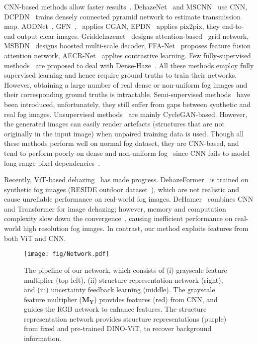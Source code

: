 \documentclass[runningheads]{llncs}
\begin{document}
CNN-based methods allow faster results~\cite{li2017haze,ye2021perceiving,lin2020gait,lin2021gait}.
DehazeNet~\cite{cai2016dehazenet} and MSCNN~\cite{ren2016single} use CNN, DCPDN~\cite{zhang2018densely} trains densely connected pyramid network to estimate transmission map.
AODNet~\cite{li2017aod}, GFN~\cite{ren2018gated},~\cite{li2018single} applies CGAN, EPDN~\cite{qu2019enhanced} applies pix2pix, they end-to-end output clear images.
Griddehazenet~\cite{liu2019griddehazenet} designs attention-based~\cite{jin2021dc} grid network, MSBDN~\cite{dong2020multi} designs boosted multi-scale decoder, FFA-Net~\cite{qin2020ffa} proposes feature fusion attention network, AECR-Net~\cite{wu2021contrastive} applies contrastive learning. 
Few fully-supervised methods~\cite{dudhane2019ri,bianco2019high,morales2019feature} are proposed to deal with Dense-Haze~\cite{ancuti2019dense}.
All these methods employ fully supervised learning and hence require ground truths to train their networks. 
However, obtaining a large number of real dense or non-uniform fog images and their corresponding ground truths is intractable. 
Semi-supervised methods~\cite{li2019semi,shao2020domain,chen2021psd,li2022physically} have been introduced, 
unfortunately, they still suffer from gaps between synthetic and real fog images.
Unsupervised methods~\cite{huang2019towards,golts2019unsupervised,li2021you,zhao2021refinednet,yang2022self} are mainly CycleGAN-based.
However, the generated images can easily render artefacts (structures that are not originally in the input image) when unpaired training data is used.
Though all these methods perform well on normal fog dataset, they are CNN-based, and tend to perform poorly on dense and non-uniform fog~\cite{guo2022image} since CNN fails to model long-range pixel dependencies~\cite{dosovitskiy2020image}.
 
Recently, ViT-based dehazing~\cite{guo2022image,song2022vision} has made progress.
DehazeFormer~\cite{song2022vision} is trained on synthetic fog images (RESIDE outdoor dataset~\cite{li2018benchmarking}), which are not realistic and cause unreliable performance on real-world fog images.
DeHamer~\cite{guo2022image} combines CNN and Transformer for image dehazing; however, memory and computation complexity slow down the convergence~\cite{zhu2020deformable}, causing inefficient performance on real-world high resolution fog images.
In contrast, our method exploits features from both ViT and CNN.

\begin{figure*}[t!]
	\centering
	{\texttt{[image: fig/Network.pdf]}}\hfill
	\caption{The pipeline of our network, which consists of (i) grayscale feature multiplier (top left), (ii) structure representation network (right), and (iii) uncertainty feedback learning (middle).
	The grayscale feature multiplier ($\mathbf{M_Y}$) provides features (red) from CNN, and guides the RGB network to enhance features. 
	The structure representation network provides structure representations (purple) from fixed and pre-trained DINO-ViT, to recover background information.}
	\label{fig:pipeline}
\end{figure*}
\end{document}
